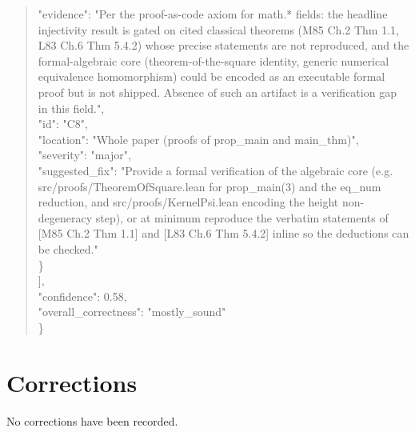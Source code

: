 \documentclass[11pt]{article}
\begin{document}
\begin{quote}
      "evidence": "Per the proof-as-code axiom for math.* fields: the headline injectivity result is gated on cited classical theorems (M85 Ch.2 Thm 1.1, L83 Ch.6 Thm 5.4.2) whose precise statements are not reproduced, and the formal-algebraic core (theorem-of-the-square identity, generic numerical equivalence homomorphism) could be encoded as an executable formal proof but is not shipped. Absence of such an artifact is a verification gap in this field.",\\
      "id": "C8",\\
      "location": "Whole paper (proofs of prop\_main and main\_thm)",\\
      "severity": "major",\\
      "suggested\_fix": "Provide a formal verification of the algebraic core (e.g. src/proofs/TheoremOfSquare.lean for prop\_main(3) and the eq\_num reduction, and src/proofs/KernelPsi.lean encoding the height non-degeneracy step), or at minimum reproduce the verbatim statements of [M85 Ch.2 Thm 1.1] and [L83 Ch.6 Thm 5.4.2] inline so the deductions can be checked."\\
    \}\\
  ],\\
  "confidence": 0.58,\\
  "overall\_correctness": "mostly\_sound"\\
\}\\
\end{quote}

\section*{Corrections}
No corrections have been recorded.
\end{document}
